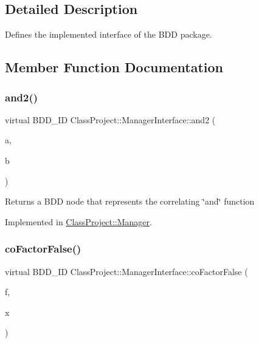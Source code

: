 \subsection{Detailed Description}
Defines the implemented interface of the B\+DD package. 

\subsection{Member Function Documentation}
\mbox{\label{classClassProject_1_1ManagerInterface_af914326d34a1ed42710f7b11e5baf010}} 
\subsubsection{\texorpdfstring{and2()}{and2()}}
{\footnotesize\ttfamily virtual B\+D\+D\+\_\+\+ID Class\+Project\+::\+Manager\+Interface\+::and2 (\begin{DoxyParamCaption}\item[{const B\+D\+D\+\_\+\+ID}]{a,  }\item[{const B\+D\+D\+\_\+\+ID}]{b }\end{DoxyParamCaption})\hspace{0.3cm}{\ttfamily [pure virtual]}}

\begin{DoxyReturn}{Returns}
a B\+DD node that represents the correlating \char`\"{}and\char`\"{} function 
\end{DoxyReturn}


Implemented in \hyperlink{classClassProject_1_1Manager_a029fff4ef6650e4fd1f0ff37a69252de}{Class\+Project\+::\+Manager}.

\mbox{\label{classClassProject_1_1ManagerInterface_ad749ef1542c5b23bbbce628d6f666fe4}} 
\subsubsection{\texorpdfstring{co\+Factor\+False()}{coFactorFalse()}\hspace{0.1cm}{\footnotesize\ttfamily [1/2]}}
{\footnotesize\ttfamily virtual B\+D\+D\+\_\+\+ID Class\+Project\+::\+Manager\+Interface\+::co\+Factor\+False (\begin{DoxyParamCaption}\item[{const B\+D\+D\+\_\+\+ID}]{f,  }\item[{B\+D\+D\+\_\+\+ID}]{x }\end{DoxyParamCaption})\hspace{0.3cm}{\ttfamily [pure virtual]}}

